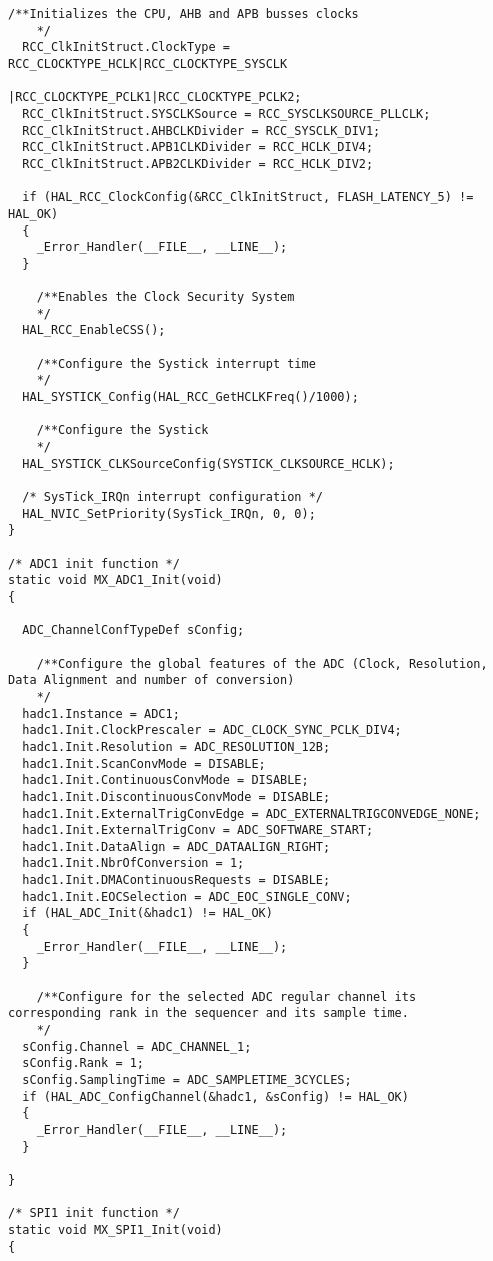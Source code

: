 \begin{lstlisting}[label=algoritmo:STM32F4:main.c,style = STM-code,frame=single,caption=STM32F4:main.c]
    /**Initializes the CPU, AHB and APB busses clocks 
    */
  RCC_ClkInitStruct.ClockType = RCC_CLOCKTYPE_HCLK|RCC_CLOCKTYPE_SYSCLK
                              |RCC_CLOCKTYPE_PCLK1|RCC_CLOCKTYPE_PCLK2;
  RCC_ClkInitStruct.SYSCLKSource = RCC_SYSCLKSOURCE_PLLCLK;
  RCC_ClkInitStruct.AHBCLKDivider = RCC_SYSCLK_DIV1;
  RCC_ClkInitStruct.APB1CLKDivider = RCC_HCLK_DIV4;
  RCC_ClkInitStruct.APB2CLKDivider = RCC_HCLK_DIV2;

  if (HAL_RCC_ClockConfig(&RCC_ClkInitStruct, FLASH_LATENCY_5) != HAL_OK)
  {
    _Error_Handler(__FILE__, __LINE__);
  }

    /**Enables the Clock Security System 
    */
  HAL_RCC_EnableCSS();

    /**Configure the Systick interrupt time 
    */
  HAL_SYSTICK_Config(HAL_RCC_GetHCLKFreq()/1000);

    /**Configure the Systick 
    */
  HAL_SYSTICK_CLKSourceConfig(SYSTICK_CLKSOURCE_HCLK);

  /* SysTick_IRQn interrupt configuration */
  HAL_NVIC_SetPriority(SysTick_IRQn, 0, 0);
}

/* ADC1 init function */
static void MX_ADC1_Init(void)
{

  ADC_ChannelConfTypeDef sConfig;

    /**Configure the global features of the ADC (Clock, Resolution, Data Alignment and number of conversion) 
    */
  hadc1.Instance = ADC1;
  hadc1.Init.ClockPrescaler = ADC_CLOCK_SYNC_PCLK_DIV4;
  hadc1.Init.Resolution = ADC_RESOLUTION_12B;
  hadc1.Init.ScanConvMode = DISABLE;
  hadc1.Init.ContinuousConvMode = DISABLE;
  hadc1.Init.DiscontinuousConvMode = DISABLE;
  hadc1.Init.ExternalTrigConvEdge = ADC_EXTERNALTRIGCONVEDGE_NONE;
  hadc1.Init.ExternalTrigConv = ADC_SOFTWARE_START;
  hadc1.Init.DataAlign = ADC_DATAALIGN_RIGHT;
  hadc1.Init.NbrOfConversion = 1;
  hadc1.Init.DMAContinuousRequests = DISABLE;
  hadc1.Init.EOCSelection = ADC_EOC_SINGLE_CONV;
  if (HAL_ADC_Init(&hadc1) != HAL_OK)
  {
    _Error_Handler(__FILE__, __LINE__);
  }

    /**Configure for the selected ADC regular channel its corresponding rank in the sequencer and its sample time. 
    */
  sConfig.Channel = ADC_CHANNEL_1;
  sConfig.Rank = 1;
  sConfig.SamplingTime = ADC_SAMPLETIME_3CYCLES;
  if (HAL_ADC_ConfigChannel(&hadc1, &sConfig) != HAL_OK)
  {
    _Error_Handler(__FILE__, __LINE__);
  }

}

/* SPI1 init function */
static void MX_SPI1_Init(void)
{


\end{lstlisting}
